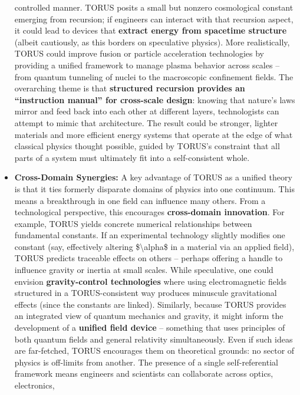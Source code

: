 \documentclass[
]{article}
\begin{document}
\begin{itemize}
  controlled manner. TORUS posits a small but nonzero cosmological
  constant emerging from recursion; if engineers can interact with that
  recursion aspect, it could lead to devices that \textbf{extract energy
  from spacetime structure} (albeit cautiously, as this borders on
  speculative physics). More realistically, TORUS could improve fusion
  or particle acceleration technologies by providing a unified framework
  to manage plasma behavior across scales -- from quantum tunneling of
  nuclei to the macroscopic confinement fields. The overarching theme is
  that \textbf{structured recursion provides an ``instruction manual''
  for cross-scale design}: knowing that nature's laws mirror and feed
  back into each other at different layers, technologists can attempt to
  mimic that architecture. The result could be stronger, lighter
  materials and more efficient energy systems that operate at the edge
  of what classical physics thought possible, guided by TORUS's
  constraint that all parts of a system must ultimately fit into a
  self-consistent whole.
\item
  \textbf{Cross-Domain Synergies:} A key advantage of TORUS as a unified
  theory is that it ties formerly disparate domains of physics into one
  continuum. This means a breakthrough in one field can influence many
  others. From a technological perspective, this encourages
  \textbf{cross-domain innovation}. For example, TORUS yields concrete
  numerical relationships between fundamental constants\hspace{0pt}. If
  an experimental technology slightly modifies one constant (say,
  effectively altering \$\textbackslash alpha\$ in a material via an
  applied field), TORUS predicts traceable effects on others -- perhaps
  offering a handle to influence gravity or inertia at small scales.
  While speculative, one could envision \textbf{gravity-control
  technologies} where using electromagnetic fields structured in a
  TORUS-consistent way produces minuscule gravitational effects (since
  the constants are linked). Similarly, because TORUS provides an
  integrated view of quantum mechanics and gravity, it might inform the
  development of a \textbf{unified field device} -- something that uses
  principles of both quantum fields and general relativity
  simultaneously. Even if such ideas are far-fetched, TORUS encourages
  them on theoretical grounds: no sector of physics is off-limits from
  another. The presence of a single self-referential framework means
  engineers and scientists can collaborate across optics, electronics,

\end{itemize}
\end{document}
